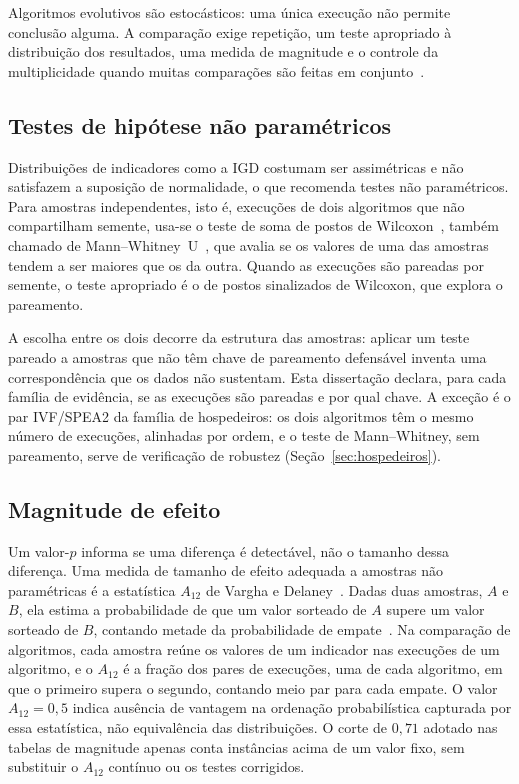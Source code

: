 Algoritmos evolutivos são estocásticos: uma única execução não permite conclusão alguma. A comparação exige repetição, um teste apropriado à distribuição dos resultados, uma medida de magnitude e o controle da multiplicidade quando muitas comparações são feitas em conjunto~\cite{ARCURI, derrac2011practical}.

\subsection{Testes de hipótese não paramétricos}

Distribuições de indicadores como a IGD costumam ser assimétricas e não satisfazem a suposição de normalidade, o que recomenda testes não paramétricos. Para amostras independentes, isto é, execuções de dois algoritmos que não compartilham semente, usa-se o teste de soma de postos de Wilcoxon~\cite{wilcoxon1945}, também chamado de Mann--Whitney~U~\cite{mann1947test}, que avalia se os valores de uma das amostras tendem a ser maiores que os da outra. Quando as execuções são pareadas por semente, o teste apropriado é o de postos sinalizados de Wilcoxon, que explora o pareamento.

A escolha entre os dois decorre da estrutura das amostras: aplicar um teste pareado a amostras que não têm chave de pareamento defensável inventa uma correspondência que os dados não sustentam. Esta dissertação declara, para cada família de evidência, se as execuções são pareadas e por qual chave. A exceção é o par IVF/SPEA2 da família de hospedeiros: os dois algoritmos têm o mesmo número de execuções, alinhadas por ordem, e o teste de Mann--Whitney, sem pareamento, serve de verificação de robustez (Seção~\ref{sec:hospedeiros}).

\subsection{Magnitude de efeito}

Um valor-$p$ informa se uma diferença é detectável, não o tamanho dessa diferença. Uma medida de tamanho de efeito adequada a amostras não paramétricas é a estatística $A_{12}$ de Vargha e Delaney~\cite{vargha2000critique}. Dadas duas amostras, $A$ e $B$, ela estima a probabilidade de que um valor sorteado de $A$ supere um valor sorteado de $B$, contando metade da probabilidade de empate~\cite{ARCURI}. Na comparação de algoritmos, cada amostra reúne os valores de um indicador nas execuções de um algoritmo, e o $A_{12}$ é a fração dos pares de execuções, uma de cada algoritmo, em que o primeiro supera o segundo, contando meio par para cada empate. O valor $A_{12} = 0{,}5$ indica ausência de vantagem na ordenação probabilística capturada por essa estatística, não equivalência das distribuições. O corte de $0{,}71$ adotado nas tabelas de magnitude apenas conta instâncias acima de um valor fixo, sem substituir o $A_{12}$ contínuo ou os testes corrigidos.

